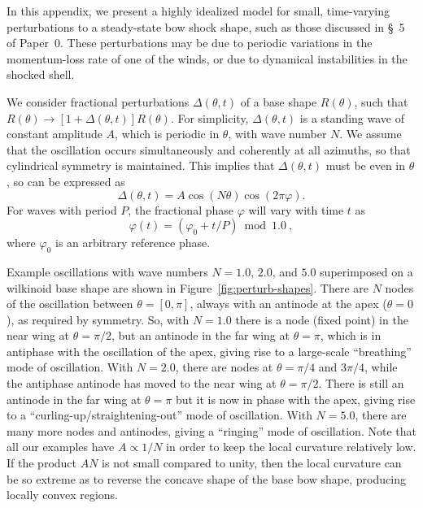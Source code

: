 \documentclass[useAMS, usenatbib, a4paper]{mnras}
\begin{document}
In this appendix, we present a highly idealized model for small,
time-varying perturbations to a steady-state bow shock shape, such as
those discussed in \S~5 of Paper~0.  These perturbations may be due to
periodic variations in the momentum-loss rate of one of the winds, or
due to dynamical instabilities in the shocked shell.

We consider fractional perturbations \(\Delta(\theta, t)\) of a base shape
\(R(\theta)\), such that
\(R(\theta) \to [1 + \Delta(\theta, t)] R(\theta)\).  For simplicity,
\(\Delta(\theta, t)\) is a standing wave of constant amplitude \(A\), which is
periodic in \(\theta\), with wave number \(N\).  We assume that the
oscillation occurs simultaneously and coherently at all azimuths, so
that cylindrical symmetry is maintained.  This implies that
\(\Delta(\theta, t)\) must be even in \(\theta\), so can be expressed as
\begin{equation}
  \label{eq:standing-wave}
  \Delta(\theta, t) = A \cos(N \theta) \cos(2\pi \varphi) . 
\end{equation}
For waves with period \(P\), the fractional phase \(\varphi\) will
vary with time \(t\) as
\begin{equation}
  \label{eq:fractional-phase}
  \varphi(t) = (\varphi_0 + t/P) \bmod 1.0\ ,
\end{equation}
where \(\varphi_0\) is an arbitrary reference phase.

Example oscillations with wave numbers \(N = 1.0\), \(2.0\), and
\(5.0\) superimposed on a wilkinoid base shape are shown in
Figure~\ref{fig:perturb-shapes}.  There are \(N\) nodes of the
oscillation between \(\theta = [0, \pi]\), always with an antinode at the apex
(\(\theta = 0\)), as required by symmetry.  So, with \(N = 1.0\) there is a
node (fixed point) in the near wing at \(\theta = \pi/2\), but an antinode in
the far wing at \(\theta = \pi\), which is in antiphase with the oscillation
of the apex, giving rise to a large-scale ``breathing'' mode of
oscillation.  With \(N = 2.0\), there are nodes at \(\theta = \pi/4\) and
\(3\pi/4\), while the antiphase antinode has moved to the near wing at
\(\theta = \pi/2\).  There is still an antinode in the far wing at
\(\theta = \pi\) but it is now in phase with the apex, giving rise to a
``curling-up/straightening-out'' mode of oscillation.  With
\(N = 5.0\), there are many more nodes and antinodes, giving a
``ringing'' mode of oscillation.  Note that all our examples have
\(A \propto 1/N\) in order to keep the local curvature relatively low.  If
the product \(A N\) is not small compared to unity, then the local
curvature can be so extreme as to reverse the concave shape of the
base bow shape, producing locally convex regions.
\end{document}
